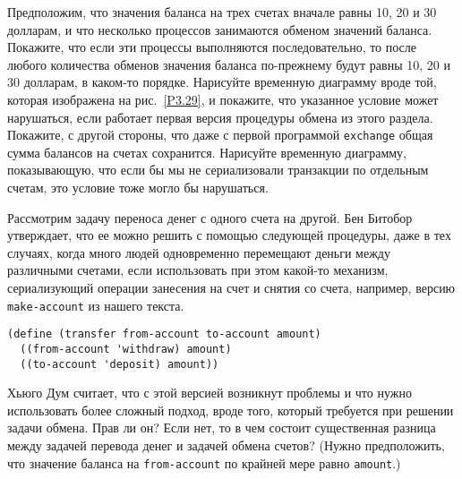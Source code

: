 \begin{exercise}{3.43}\label{EX3.43}%
Предположим, что значения баланса на трех счетах
вначале равны  10, 20 и 30 долларам, и что несколько
процессов занимаются обменом значений баланса.  Покажите, что если эти
процессы выполняются последовательно, то после любого количества
обменов значения баланса по-прежнему будут равны 10, 20 и 30 долларам,
в каком-то порядке.  Нарисуйте временную диаграмму вроде той, которая
изображена на рис.~\ref{P3.29}, и покажите, что указанное
условие может нарушаться, если работает первая версия процедуры обмена
из этого раздела.  Покажите, с другой стороны, что даже с первой
программой {\tt exchange} общая сумма балансов на счетах
сохранится. Нарисуйте временную диаграмму, показывающую, что если бы
мы не сериализовали транзакции по отдельным счетам, это условие тоже
могло бы нарушаться.
\end{exercise}
\begin{exercise}{3.44}\label{EX3.44}%
Рассмотрим задачу   переноса денег с
одного счета на другой.  Бен Битобор утверждает, что ее можно
решить с помощью следующей процедуры, даже в тех случаях, когда много
людей одновременно перемещают деньги между различными счетами, если
использовать при этом какой-то механизм, сериализующий операции
занесения на счет и снятия со счета, например, версию
{\tt make-account} из нашего текста.

\begin{Verbatim}[fontsize=\small]
(define (transfer from-account to-account amount)
  ((from-account 'withdraw) amount)
  ((to-account 'deposit) amount))
\end{Verbatim}
Хьюго Дум считает, что с этой версией возникнут проблемы и что нужно
использовать более сложный подход, вроде того, который требуется при
решении задачи обмена.  Прав ли он?  Если нет, то в чем состоит
существенная разница между задачей перевода денег и задачей обмена
счетов?  (Нужно предположить, что значение баланса на
{\tt from-account} по крайней мере равно {\tt amount}.)
\end{exercise}
